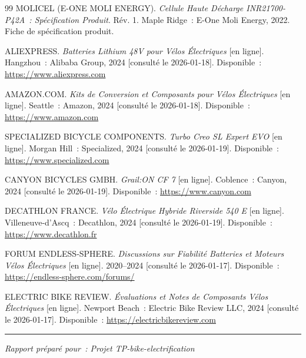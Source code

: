 \documentclass[12pt,a4paper]{article}
\begin{document}
\begin{thebibliography}{99}
MOLICEL (E-ONE MOLI ENERGY). \textit{Cellule Haute Décharge INR21700-P42A~: Spécification Produit}. Rév. 1. Maple Ridge~: E-One Moli Energy, 2022. Fiche de spécification produit.

ALIEXPRESS. \textit{Batteries Lithium 48V pour Vélos Électriques} [en ligne]. Hangzhou~: Alibaba Group, 2024 [consulté le 2026-01-18]. Disponible~: \url{https://www.aliexpress.com}

AMAZON.COM. \textit{Kits de Conversion et Composants pour Vélos Électriques} [en ligne]. Seattle~: Amazon, 2024 [consulté le 2026-01-18]. Disponible~: \url{https://www.amazon.com}

SPECIALIZED BICYCLE COMPONENTS. \textit{Turbo Creo SL Expert EVO} [en ligne]. Morgan Hill~: Specialized, 2024 [consulté le 2026-01-19]. Disponible~: \url{https://www.specialized.com}

CANYON BICYCLES GMBH. \textit{Grail:ON CF 7} [en ligne]. Coblence~: Canyon, 2024 [consulté le 2026-01-19]. Disponible~: \url{https://www.canyon.com}

DECATHLON FRANCE. \textit{Vélo Électrique Hybride Riverside 540 E} [en ligne]. Villeneuve-d'Ascq~: Decathlon, 2024 [consulté le 2026-01-19]. Disponible~: \url{https://www.decathlon.fr}

FORUM ENDLESS-SPHERE. \textit{Discussions sur Fiabilité Batteries et Moteurs Vélos Électriques} [en ligne]. 2020--2024 [consulté le 2026-01-17]. Disponible~: \url{https://endless-sphere.com/forums/}

ELECTRIC BIKE REVIEW. \textit{Évaluations et Notes de Composants Vélos Électriques} [en ligne]. Newport Beach~: Electric Bike Review LLC, 2024 [consulté le 2026-01-17]. Disponible~: \url{https://electricbikereview.com}

\end{thebibliography}

\vspace{1cm}
\noindent\rule{\textwidth}{0.4pt}

\noindent\textit{Rapport préparé pour~: Projet TP-bike-electrification}\\
\end{document}
